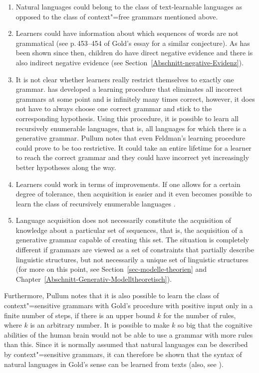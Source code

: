 \begin{enumerate}
\item Natural languages could belong to the class of text-learnable languages as opposed to the class of context"=free grammars mentioned above.

\item Learners could have information about which sequences of words are not grammatical (see p.\,453--454 of Gold's essay for a similar
conjecture). As has been shown since then, children do have direct negative evidence and there is also indirect
negative evidence (see Section~\ref{Abschnitt-negative-Evidenz}). 

\item It is not clear whether learners really restrict themselves to exactly one grammar. \citet{Feldman72a} has developed a learning procedure that
eliminates all incorrect grammars at some point and is infinitely many times correct, however, it does not have to always choose one correct grammar
and stick to the corresponding hypothesis.
Using this procedure, it is possible to learn all recursively enumerable languages, that is, all languages
for which there is a generative grammar. Pullum notes that even Feldman's learning procedure could prove to be too restrictive. It could take an entire
lifetime for a learner to reach the correct grammar and they could have incorrect yet increasingly better hypotheses along the way.

\item Learners could work in terms of improvements. If one allows for a certain degree of tolerance, then acquisition is easier and it even becomes
possible to learn the class of recursively enumerable languages  \citep{Wharton74a}.

\item Language acquisition does not necessarily constitute the acquisition of knowledge about a particular set of sequences, that is, the acquisition
of a generative grammar capable of creating this set. The situation is completely different if grammars are viewed as a set of constraints that
partially describe linguistic structures, but not necessarily a unique set of linguistic structures (for more on this point, see
      Section~\ref{sec-modelle-theorien} and Chapter~\ref{Abschnitt-Generativ-Modelltheoretisch}).
\end{enumerate}

\noindent
Furthermore, Pullum notes that it is also possible to learn the class of context"=sensitive grammars
with Gold's procedure with positive input only in a finite number of steps, if there is an upper
bound $k$ for the number of rules, where $k$ is an arbitrary number.
It is possible to make $k$ so big that the cognitive abilities of the human brain would not be able to use a grammar with more rules than this.
Since it is normally assumed that natural languages can be described by context"=sensitive grammars, it can therefore
be shown that the syntax of natural languages in Gold's sense can be learned from texts (also, see \citealp[--196]{SP2002b}).  

